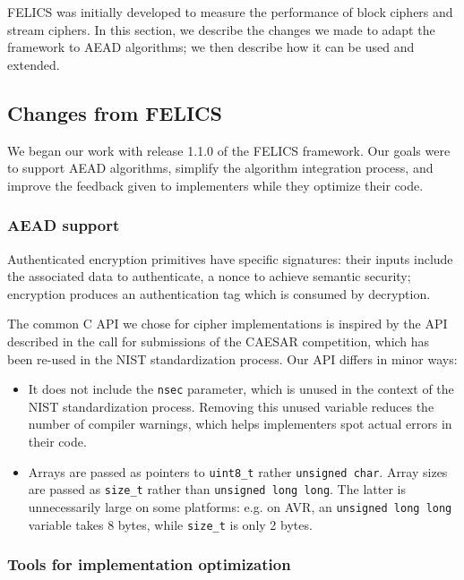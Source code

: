 \documentclass{article}
\begin{document}
FELICS was initially developed to measure the performance of block
ciphers and stream ciphers.  In this section, we describe the changes
we made to adapt the framework to AEAD algorithms; we then describe
how it can be used and extended.

\subsection{Changes from FELICS}
\label{sec:felics-ae/diff-felics}

We began our work with release 1.1.0 of the FELICS framework.  Our
goals were to support AEAD algorithms, simplify the algorithm
integration process, and improve the feedback given to implementers
while they optimize their code.

\subsubsection{AEAD support}
\label{sec:felics-ae/aead-support}

Authenticated encryption primitives have specific signatures: their
inputs include the associated data to authenticate, a nonce to achieve
semantic security\cite{Rogaway:AEAD}; encryption produces an
authentication tag which is consumed by decryption.

The common C API we chose for cipher implementations is inspired by
the API described in the call for submissions of the CAESAR
competition\cite{CAESAR:call}, which has been re-used in the NIST
standardization process\cite{NIST:LWC-requirements}.  Our API differs
in minor ways:

\begin{itemize}
\item It does not include the \texttt{nsec} parameter, which is unused
  in the context of the NIST standardization process.  Removing this
  unused variable reduces the number of compiler warnings, which helps
  implementers spot actual errors in their code.
\item Arrays are passed as pointers to \texttt{uint8\_t} rather
  \texttt{unsigned char}.  Array sizes are passed as \texttt{size\_t}
  rather than \texttt{unsigned long long}.  The latter is
  unnecessarily large on some platforms: e.g. on AVR, an
  \texttt{unsigned long long} variable takes 8 bytes, while
  \texttt{size\_t} is only 2 bytes.
\end{itemize}

\subsubsection{Tools for implementation optimization}
\label{sec:felics-ae/tools-opt}
\end{document}
